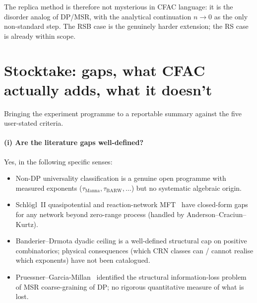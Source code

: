 \documentclass[11pt,a4paper]{article}
\theoremstyle{plain}
\begin{document}
The replica method is therefore not mysterious in CFAC language: it is
the disorder analog of DP/MSR, with the analytical continuation $n\to 0$
as the only non-standard step.  The RSB case is the genuinely harder
extension; the RS case is already within scope.

\section{Stocktake: gaps, what CFAC actually adds, what it doesn't}
\label{sec:stocktake}

Bringing the experiment programme to a reportable summary against the
five user-stated criteria.

\paragraph{(i) Are the literature gaps well-defined?}
Yes, in the following specific senses:
\begin{itemize}[leftmargin=1.2em]
\item Non-DP universality classification is a genuine open programme
  \citep{Hinrichsen2000,Odor2004} with measured exponents
  ($\tau_{\mathrm{Manna}}, \tau_{\mathrm{BARW}}, \dots$) but no
  systematic algebraic origin.
\item Schl\"ogl~II quasipotential and reaction-network
  MFT~\citep{PrakashNicholson2024} have closed-form gaps for any
  network beyond zero-range process (handled by Anderson--Craciun--Kurtz).
\item Banderier--Drmota dyadic ceiling \citep{BanderierDrmota2015} is a
  well-defined structural cap on positive combinatorics; physical
  consequences (which CRN classes can / cannot realise which exponents)
  have not been catalogued.
\item Pruessner--Garcia-Millan~\citep{PruessnerGarciaMillan2025}
  identified the structural information-loss problem of MSR
  coarse-graining of DP; no rigorous quantitative measure of what is
  lost.
\end{itemize}
\end{document}
